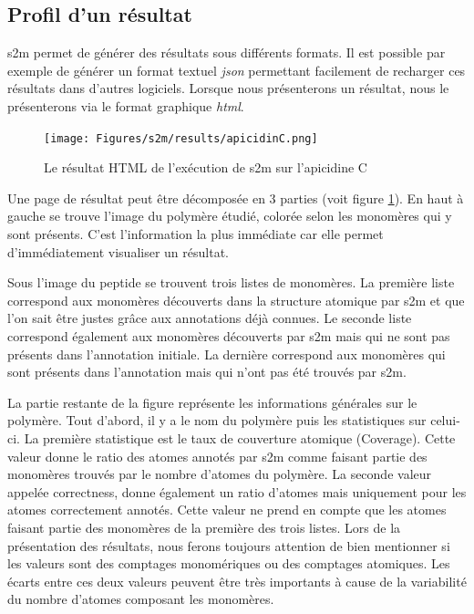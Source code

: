 \subsection{Profil d'un résultat}

s2m permet de générer des résultats sous différents formats.
Il est possible par exemple de générer un format textuel \textit{json} permettant facilement de recharger ces résultats dans d'autres logiciels.
Lorsque nous présenterons un résultat, nous le présenterons via le format graphique \textit{html}.

\begin{figure}[!ht]
  \begin{center}
    \texttt{[image: Figures/s2m/results/apicidinC.png]}
    \caption{\label{s2m_HTML}Le résultat HTML de l'exécution de s2m sur l'apicidine C}
  \end{center}
\end{figure}

Une page de résultat peut être décomposée en 3 parties (voit figure \ref{s2m_HTML}).
En haut à gauche se trouve l'image du polymère étudié, colorée selon les monomères qui y sont présents.
C'est l'information la plus immédiate car elle permet d'immédiatement visualiser un résultat.

Sous l'image du peptide se trouvent trois listes de monomères.
La première liste correspond aux monomères découverts dans la structure atomique par s2m et que l'on sait être justes grâce aux annotations déjà connues.
Le seconde liste correspond également aux monomères découverts par s2m mais qui ne sont pas présents dans l'annotation initiale.
La dernière correspond aux monomères qui sont présents dans l'annotation mais qui n'ont pas été trouvés par s2m.

La partie restante de la figure représente les informations générales sur le polymère.
Tout d'abord, il y a le nom du polymère puis les statistiques sur celui-ci.
La première statistique est le taux de couverture atomique (Coverage).
Cette valeur donne le ratio des atomes annotés par s2m comme faisant partie des monomères trouvés par le nombre d'atomes du polymère.
La seconde valeur appelée correctness, donne également un ratio d'atomes mais uniquement pour les atomes correctement annotés.
Cette valeur ne prend en compte que les atomes faisant partie des monomères de la première des trois listes.
Lors de la présentation des résultats, nous ferons toujours attention de bien mentionner si les valeurs sont des comptages monomériques ou des comptages atomiques.
Les écarts entre ces deux valeurs peuvent être très importants à cause de la variabilité du nombre d'atomes composant les monomères.





